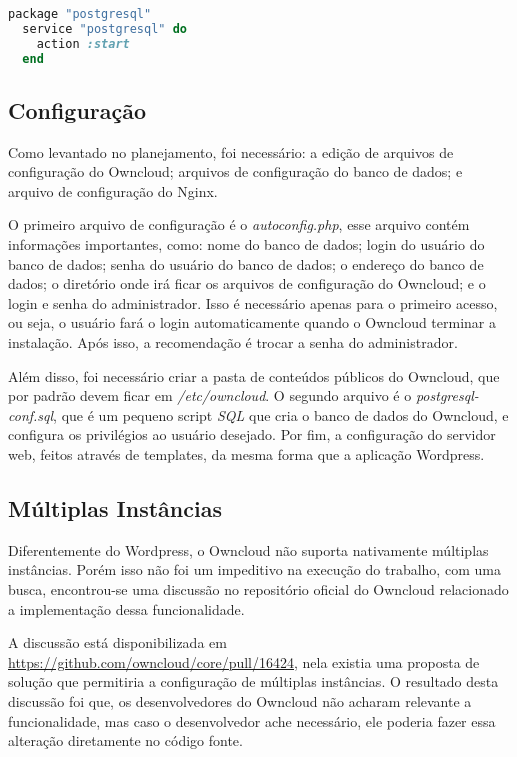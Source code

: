 \begin{lstlisting}[language=Ruby,label=dice_index,caption={Exemplo de como habilitar serviço do postgresql com chef}, label=codigo995]
  package "postgresql"
  service "postgresql" do
    action :start
  end
\end{lstlisting}

\subsection{Configuração}

Como levantado no planejamento, foi necessário: a edição de arquivos de configuração
do Owncloud; arquivos de configuração do banco de dados; e arquivo de configuração
do Nginx.

O primeiro arquivo de configuração é o \textit{autoconfig.php}, esse arquivo
contém informações importantes, como: nome do banco de dados;
login do usuário do banco de dados; senha do usuário do banco de dados; o endereço 
do banco de dados; o diretório
onde irá ficar os arquivos de configuração do Owncloud; e o login e senha
do administrador. Isso é necessário apenas para o primeiro acesso, ou seja, o usuário
fará o login automaticamente quando o Owncloud terminar a instalação. Após isso,
a recomendação é trocar a senha do administrador.

Além disso, foi necessário criar a pasta de conteúdos públicos do Owncloud, que por
padrão devem ficar em \textit{/etc/owncloud}. O segundo arquivo é o 
\textit{postgresql-conf.sql}, que é um pequeno script \textit{SQL} que cria o 
banco de dados do Owncloud, e configura os
privilégios ao usuário desejado. Por fim, a configuração do servidor web, feitos
através de templates, da mesma forma que a aplicação Wordpress.

\subsection{Múltiplas Instâncias}

Diferentemente do Wordpress, o Owncloud não suporta nativamente múltiplas instâncias. Porém isso
não foi um impeditivo na execução do trabalho, com uma busca, encontrou-se uma 
discussão no repositório oficial do Owncloud relacionado a implementação dessa 
funcionalidade. 

A discussão está disponibilizada em 
\url{https://github.com/owncloud/core/pull/16424}, nela existia
uma proposta de solução que permitiria a configuração de múltiplas instâncias. O
resultado desta discussão foi que, os desenvolvedores do Owncloud não acharam relevante
a funcionalidade, mas caso o desenvolvedor ache necessário, ele poderia fazer essa
alteração diretamente no código fonte.

